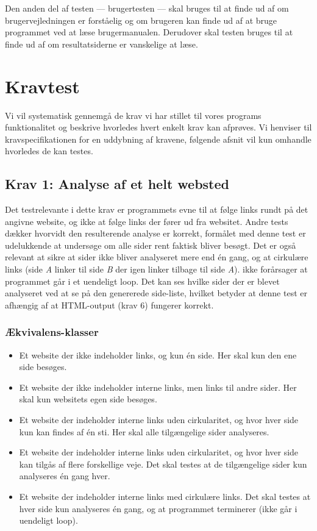 \documentclass[a4paper,oneside,article, titlepage]{memoir}
\begin{document}
Den anden del af testen --- brugertesten --- skal bruges til at finde
ud af om brugervejledningen er forståelig og om brugeren kan finde ud
af at bruge programmet ved at læse brugermanualen. Derudover skal
testen bruges til at finde ud af om resultatsiderne er vanskelige at
læse.

\chapter{Kravtest}

Vi vil systematisk gennemgå de krav vi har stillet til vores programs
funktionalitet og beskrive hvorledes hvert enkelt krav kan
afprøves. Vi henviser til kravspecifikationen for en uddybning af
kravene, følgende afsnit vil kun omhandle hvorledes de kan testes.

\section*{Krav 1: Analyse af et helt websted}

Det testrelevante i dette krav er programmets evne til at følge links
rundt på det angivne website, og ikke at følge links der fører ud fra
websitet. Andre tests dækker hvorvidt den resulterende analyse er
korrekt, formålet med denne test er udelukkende at undersøge om alle
sider rent faktisk bliver besøgt. Det er også relevant at sikre at
sider ikke bliver analyseret mere end én gang, og at cirkulære links
(side \textit{A} linker til side \textit{B} der igen linker tilbage
til side \textit{A}). ikke forårsager at programmet går i et uendeligt
loop. Det kan ses hvilke sider der er blevet analyseret ved at se på
den genererede side-liste, hvilket betyder at denne test er afhængig
af at HTML-output (krav 6) fungerer korrekt.

\subsection{Ækvivalens-klasser}
\begin{itemize}
\item Et website der ikke indeholder links, og kun én side. Her skal
  kun den ene side besøges.
\item Et website der ikke indeholder interne links, men links til
  andre sider. Her skal kun websitets egen side besøges.
\item Et website der indeholder interne links uden cirkularitet, og
  hvor hver side kun kan findes af én sti. Her skal alle tilgængelige
  sider analyseres.
\item Et website der indeholder interne links uden cirkularitet, og
  hvor hver side kan tilgås af flere forskellige veje. Det skal testes
  at de tilgængelige sider kun analyseres én gang hver.
\item Et website der indeholder interne links med cirkulære links. Det
  skal testes at hver side kun analyseres én gang, og at programmet
  terminerer (ikke går i uendeligt loop).
\end{itemize}
\end{document}
